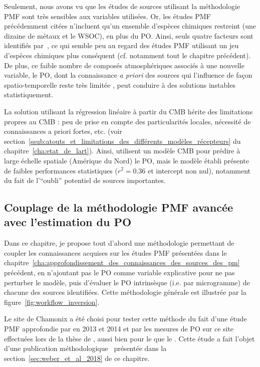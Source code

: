 Seulement, nous avons vu que les études de sources utilisant la méthodologie PMF sont très
sensibles aux variables utilisées. Or, les études PMF précédemment citées n'incluent qu'un
ensemble d'espèces chimiques restreint (une dizaine de métaux et le WSOC), en plus du PO.
Ainsi, seuls quatre facteurs sont identifiés par~\cite{fangOxidative2016}, ce qui semble peu au regard
des études PMF utilisant un jeu d'espèces chimiques plus conséquent (cf.  notamment tout
le chapitre précédent). De plus, ce faible nombre de composés atmosphériques associés à
une nouvelle variable, le PO, dont la connaissance \textit{a priori} des sources qui
l'influence de façon spatio-temporelle reste très limitée , peut conduire à des solutions
instables statistiquement.

La solution utilisant la régression linéaire à partir du CMB hérite des limitations
propres au CMB : peu de prise en compte des particularités locales, nécessité de
connaissances a priori fortes, etc. (voir
section~\ref{ssub:atouts_et_limitations_des_différents_modèles_récepteurs} du
chapitre~\ref{cha:etat_de_lart}).  Ainsi, \cite{batesSource2018} utilisent un modèle CMB
pour prédire à large échelle spatiale (Amérique du Nord) le PO, mais le modèle établi
présente de faibles performances statistiques ($r^2 = 0.36$ et intercept non nul),
notamment du fait de l'``oubli'' potentiel de sources importantes.

\subsection{Couplage de la méthodologie PMF avancée avec l'estimation du PO}%
\label{sub:couplage_de_pmf_avancée_avec_l_estimation_du_po}

Dans ce chapitre, je propose tout d'abord une méthodologie permettant de coupler les
connaissances acquises sur les études PMF présentées
dans le chapitre~\ref{cha:approfondissement_des_connaissances_des_sources_des_pm}
précédent, en n'ajoutant pas le PO comme variable explicative pour ne pas perturber le
modèle, puis d'évaluer le PO intrinsèque (i.e. par microgramme) de chacune des sources
identifiées. Cette méthodologie générale est illustrée par la figure~\ref{fig:workflow_inversion}.

Le site de Chamonix a été choisi pour tester cette méthode du fait d'une étude PMF
approfondie par \cite{chevrierChauffage2016} en 2013 et 2014 et par les mesures de PO sur
ce site effectuées lors de la thèse de \cite{calasPollution2017}, aussi bien pour le
\POAA{} que le \PODTT. Cette étude a fait l'objet d'une publication
méthodologique~\autocite{weberApportionment2018} présentée dans la
section~\ref{sec:weber_et_al_2018} de ce chapitre.

